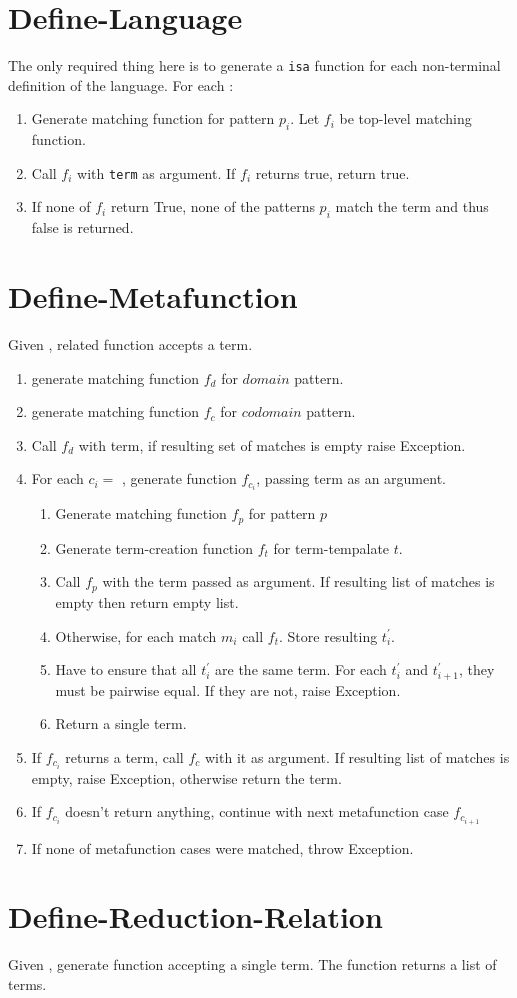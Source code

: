 \section{Define-Language}

The only required thing here is to generate a \texttt{isa} function for each non-terminal definition of the language. For each \NtDefinition:
\begin{enumerate}
\item Generate matching function for pattern $p_i$. Let $f_i$ be top-level matching function.
\item Call $f_i$ with \texttt{term} as argument. If $f_i$ returns true, return true.
\item If none of $f_i$ return True, none of the patterns $p_i$ match the term and thus false is returned.
\end{enumerate}



\section{Define-Metafunction}

Given \DefineMetafunction, related function accepts a term.

\begin{enumerate}
\item generate matching function $f_d$ for $domain$ pattern.
\item generate matching function $f_c$ for $codomain$ pattern.
\item Call $f_d$ with term, if resulting set of matches is empty raise Exception.
\item For each $c_i =$ \MetafunctionCase, generate function $f_{c_i}$, passing term as an argument.
\begin{enumerate}
	\item Generate matching function $f_{p}$ for pattern $p$
	\item Generate term-creation function $f_t$ for term-tempalate $t$.
	\item Call $f_p$ with the term passed as argument. If resulting list of matches is empty then return empty list.
	\item Otherwise, for each match $m_i$ call $f_t$. Store resulting $t_i^\prime$.
	\item Have to ensure that all $t_i^\prime$ are the same term. For each $t_i^\prime$ and $t_{i+1}^\prime$, they must be pairwise equal. If they are not, raise Exception.
	\item Return a single term.
\end{enumerate}
\item If $f_{c_i}$ returns a term, call $f_c$ with it as argument. If resulting list of matches is empty, raise Exception, otherwise return the term.
\item If $f_{c_i}$ doesn't return anything, continue with next metafunction case $f_{c_{i+1}}$
\item If none of metafunction cases were matched, throw Exception.
\end{enumerate}

\section{Define-Reduction-Relation}
Given \DefineReductionRelation, generate function accepting a single term. The function returns a list of terms.

